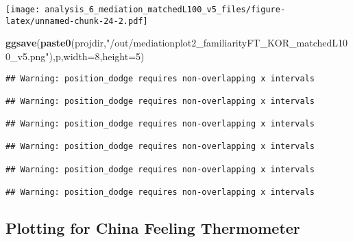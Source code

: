 \documentclass[
]{article}
\newenvironment{Shaded}{\begin{snugshade}}{\end{snugshade}}
\newcommand{\DataTypeTok}[1]{\textcolor[rgb]{0.13,0.29,0.53}{#1}}
\newcommand{\DecValTok}[1]{\textcolor[rgb]{0.00,0.00,0.81}{#1}}
\newcommand{\KeywordTok}[1]{\textcolor[rgb]{0.13,0.29,0.53}{\textbf{#1}}}
\newcommand{\NormalTok}[1]{#1}
\newcommand{\StringTok}[1]{\textcolor[rgb]{0.31,0.60,0.02}{#1}}
\begin{document}
\texttt{[image: analysis\_6\_mediation\_matchedL100\_v5\_files/figure-latex/unnamed-chunk-24-2.pdf]}

\begin{Shaded}
\begin{Highlighting}[]
\KeywordTok{ggsave}\NormalTok{(}\KeywordTok{paste0}\NormalTok{(projdir,}\StringTok{"/out/mediationplot2_familiarityFT_KOR_matchedL100_v5.png"}\NormalTok{),p,}\DataTypeTok{width=}\DecValTok{8}\NormalTok{,}\DataTypeTok{height=}\DecValTok{5}\NormalTok{)}
\end{Highlighting}
\end{Shaded}

\begin{verbatim}
## Warning: position_dodge requires non-overlapping x intervals

## Warning: position_dodge requires non-overlapping x intervals

## Warning: position_dodge requires non-overlapping x intervals

## Warning: position_dodge requires non-overlapping x intervals

## Warning: position_dodge requires non-overlapping x intervals

## Warning: position_dodge requires non-overlapping x intervals
\end{verbatim}

\hypertarget{plotting-for-china-feeling-thermometer}{%
\subsection{Plotting for China Feeling
Thermometer}\label{plotting-for-china-feeling-thermometer}}
\end{document}
